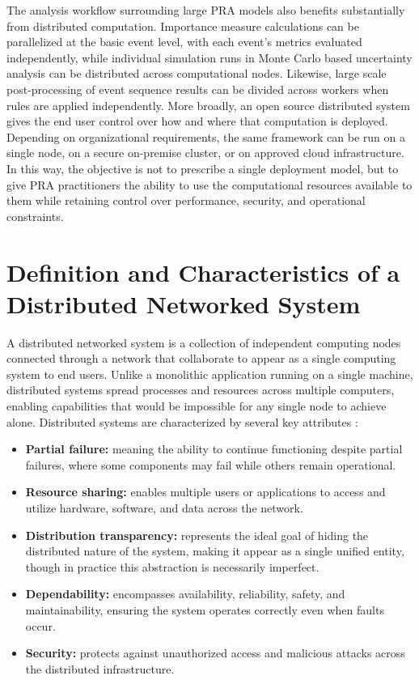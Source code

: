 The analysis workflow surrounding large PRA models also benefits substantially from distributed computation. Importance measure calculations can be parallelized at the basic event level, with each event's metrics evaluated independently, while individual simulation runs in Monte Carlo based uncertainty analysis can be distributed across computational nodes. Likewise, large scale post-processing of event sequence results can be divided across workers when rules are applied independently. More broadly, an open source distributed system gives the end user control over how and where that computation is deployed. Depending on organizational requirements, the same framework can be run on a single node, on a secure on-premise cluster, or on approved cloud infrastructure. In this way, the objective is not to prescribe a single deployment model, but to give PRA practitioners the ability to use the computational resources available to them while retaining control over performance, security, and operational constraints.

\section{Definition and Characteristics of a Distributed Networked System}
\label{sec:ds-definition}
A distributed networked system is a collection of independent computing nodes connected through a network that collaborate to appear as a single computing system to end users. Unlike a monolithic application running on a single machine, distributed systems spread processes and resources across multiple computers, enabling capabilities that would be impossible for any single node to achieve alone. Distributed systems are characterized by several key attributes \cite{steen_distributed_2023}:
\begin{itemize}
    \item \textbf{Partial failure:} meaning the ability to continue functioning despite partial failures, where some components may fail while others remain operational.
    \item \textbf{Resource sharing:} enables multiple users or applications to access and utilize hardware, software, and data across the network.
    \item \textbf{Distribution transparency:} represents the ideal goal of hiding the distributed nature of the system, making it appear as a single unified entity, though in practice this abstraction is necessarily imperfect.
    \item \textbf{Dependability:} encompasses availability, reliability, safety, and maintainability, ensuring the system operates correctly even when faults occur.
    \item \textbf{Security:} protects against unauthorized access and malicious attacks across the distributed infrastructure.
\end{itemize}

